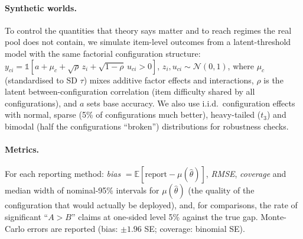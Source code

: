 \paragraph{Synthetic worlds.}
To control the quantities that theory says matter and to reach regimes the real pool does not contain, we simulate item-level outcomes from a latent-threshold model with the same factorial configuration structure: $y_{ci}=\mathbb 1[a+\mu_c+\sqrt{\rho}\,z_i+\sqrt{1-\rho}\,u_{ci}>0]$, $z_i,u_{ci}\sim\mathcal N(0,1)$, where $\mu_c$ (standardised to SD $\tau$) mixes additive factor effects and interactions, $\rho$ is the latent between-configuration correlation (item difficulty shared by all configurations), and $a$ sets base accuracy. We also use i.i.d.\ configuration effects with normal, sparse (5\% of configurations much better), heavy-tailed ($t_3$) and bimodal (half the configurations ``broken'') distributions for robustness checks.

\paragraph{Metrics.}
For each reporting method: \emph{bias} $=\mathbb{E}[\text{report}-\mu(\hat\theta)]$, \emph{RMSE}, \emph{coverage} and median width of nominal-95\% intervals for $\mu(\hat\theta)$ (the quality of the configuration that would actually be deployed), and, for comparisons, the rate of significant ``$A>B$'' claims at one-sided level 5\% against the true gap. Monte-Carlo errors are reported (bias: $\pm1.96$ SE; coverage: binomial SE).
